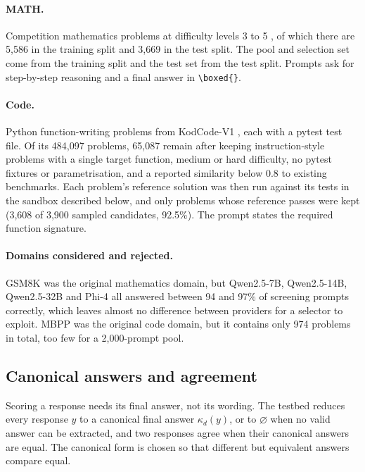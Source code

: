 \paragraph{MATH.} Competition mathematics problems at difficulty levels 3 to 5
\autocite{hendrycks_math_2021}, of which there are 5,586 in the training split and 3,669
in the test split. The pool and selection set come from the training split and the
test set from the test split. Prompts ask for step-by-step reasoning and a final answer
in \verb|\boxed{}|.

\paragraph{Code.} Python function-writing problems from KodCode-V1
\autocite{xu_kodcode_2025}, each with a pytest test file. Of its 484,097 problems, 65,087
remain after keeping instruction-style problems with a single target function, medium
or hard difficulty, no pytest fixtures or parametrisation, and a reported similarity
below 0.8 to existing benchmarks. Each problem's reference solution was then run against
its tests in the sandbox described below, and only problems whose reference passes were
kept (3,608 of 3,900 sampled candidates, 92.5\%). The prompt states the required
function signature.

\paragraph{Domains considered and rejected.} GSM8K \autocite{cobbe_gsm8k_2021} was the
original mathematics domain, but Qwen2.5-7B, Qwen2.5-14B, Qwen2.5-32B and Phi-4 all
answered between 94 and 97\% of screening prompts correctly, which leaves almost no
difference between providers for a selector to exploit. MBPP \autocite{austin_mbpp_2021} was the original
code domain, but it contains only 974 problems in total, too few for a 2,000-prompt pool.

\subsection{Canonical answers and agreement}
\label{imp:sec:canonical}

Scoring a response needs its final answer, not its wording. The
testbed reduces every response $y$ to a canonical final answer
$\kappa_d(y)$, or to $\varnothing$ when no valid answer can be extracted, and two
responses agree when their canonical answers are equal. The canonical form is chosen so
that different but equivalent answers compare equal.

